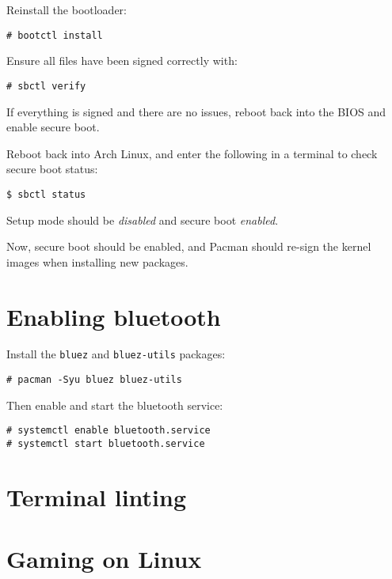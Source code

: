 \documentclass[a4paper]{article}
\begin{document}
Reinstall the bootloader:
\begin{lstlisting}
# bootctl install
\end{lstlisting}

Ensure all files have been signed correctly with:
\begin{lstlisting}
# sbctl verify
\end{lstlisting}

If everything is signed and there are no issues, reboot back into the BIOS and enable secure boot.

Reboot back into Arch Linux, and enter the following in a terminal to check secure boot status:
\begin{lstlisting}
$ sbctl status
\end{lstlisting}

Setup mode should be \emph{disabled} and secure boot \emph{enabled}.

Now, secure boot should be enabled, and Pacman should re-sign the kernel images when installing new packages.

\section{Enabling bluetooth}

Install the \lstinline|bluez| and \lstinline|bluez-utils| packages:
\begin{lstlisting}
# pacman -Syu bluez bluez-utils
\end{lstlisting}

Then enable and start the bluetooth service:
\begin{lstlisting}
# systemctl enable bluetooth.service
# systemctl start bluetooth.service
\end{lstlisting}

\section{Terminal linting}

\section{Gaming on Linux}



\end{document}
